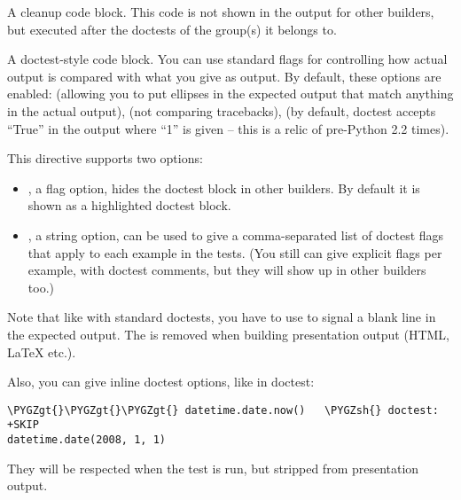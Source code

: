 \documentclass[letterpaper,10pt,english]{sphinxmanual}
\def\PYGZgt{\char`\>}
\def\PYGZsh{\char`\#}
\begin{document}

\begin{fulllineitems}
\label{ext/doctest:directive-testcleanup}
A cleanup code block.  This code is not shown in the output for other
builders, but executed after the doctests of the group(s) it belongs to.


\end{fulllineitems}


\begin{fulllineitems}
\label{ext/doctest:directive-doctest}
A doctest-style code block.  You can use standard  flags for
controlling how actual output is compared with what you give as output.  By
default, these options are enabled:  (allowing you to put
ellipses in the expected output that match anything in the actual output),
 (not comparing tracebacks),
 (by default, doctest accepts ``True'' in the output
where ``1'' is given -- this is a relic of pre-Python 2.2 times).

This directive supports two options:
\begin{itemize}
\item {} 
, a flag option, hides the doctest block in other builders.  By
default it is shown as a highlighted doctest block.

\item {} 
, a string option, can be used to give a comma-separated list of
doctest flags that apply to each example in the tests.  (You still can give
explicit flags per example, with doctest comments, but they will show up in
other builders too.)

\end{itemize}

Note that like with standard doctests, you have to use  to
signal a blank line in the expected output.  The  is removed
when building presentation output (HTML, LaTeX etc.).

Also, you can give inline doctest options, like in doctest:

\begin{Verbatim}[commandchars=\\\{\}]
\PYGZgt{}\PYGZgt{}\PYGZgt{} datetime.date.now()   \PYGZsh{} doctest: +SKIP
datetime.date(2008, 1, 1)
\end{Verbatim}

They will be respected when the test is run, but stripped from presentation
output.

\end{fulllineitems}
\end{document}
